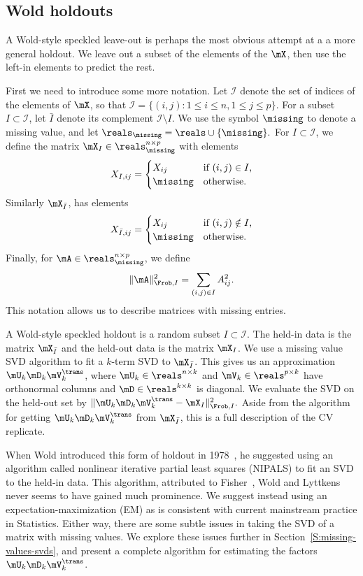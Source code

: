 \subsection{Wold holdouts}

A Wold-style speckled leave-out is perhaps the most obvious attempt at a a
more general holdout. We leave out a subset of the elements of the $\mX$, then
use the left-in elements to predict the rest.

First we need to introduce some more notation. Let $\mathcal{I}$ denote the
set of indices of the elements of $\mX$, so that $\mathcal{I} = \{ (i,j) : 1
\leq i \leq n, 1 \leq j \leq p \}$. For a subset $I \subset \mathcal{I}$, let
$\bar I$ denote its complement $\mathcal{I} \setminus I$. We use the symbol
$\missing$ to denote a missing value, and let 
\(
    \reals_\missing = \reals \cup \{ \missing \}.
\)
For $I \subset \mathcal{I}$, we define the matrix $\mX_I \in
\reals_\missing^{n \times p}$ with elements
\[
    X_{I,ij}
    =
    \begin{cases}
        X_{ij}     &\text{if $(i,j) \in I$,} \\
        \missing   &\text{otherwise.}
    \end{cases}
\]
Similarly $\mX_{\bar I}$, has elements
\[
    X_{\bar I,ij}
    =
    \begin{cases}
        X_{ij}     &\text{if $(i,j) \notin I$,} \\
        \missing   &\text{otherwise.}
    \end{cases}
\]
Finally, for $\mA \in \reals_\missing^{n \times p}$, we define
\[
    \| \mA \|_{\Frob,I}^2
        =
        \sum_{(i,j) \in I} A_{ij}^2.
\]
This notation allows us to describe matrices with missing entries.

A Wold-style speckled holdout is a random subset $I \subset \mathcal{I}$.  The 
held-in data is the matrix $\mX_{\bar I}$ and the held-out data is the matrix 
$\mX_I$.  We use a missing value SVD algorithm to fit a $k$-term SVD to 
$\mX_{\bar I}$.  This gives us an approximation $\mU_k \mD_k \mV_k^\trans$, 
where $\mU_k \in \reals^{n \times k}$ and $\mV_k \in \reals^{p \times k}$ have 
orthonormal columns and $\mD \in \reals^{k \times k}$ is diagonal.  We 
evaluate the SVD on the held-out set by 
\(
    \| \mU_k \mD_k \mV_k^\trans - \mX_I \|_{\Frob,I}^2.
\)
Aside from the algorithm for getting $\mU_k \mD_k \mV_k^\trans$ from 
$\mX_{\bar I}$, this is a full description of the CV replicate.

When Wold introduced this form of holdout in 1978~\cite{wold1978cross}, he
suggested using an algorithm called nonlinear iterative partial least squares
(NIPALS) to fit an SVD to the held-in data. This algorithm, attributed to
Fisher~\cite{fisher1923scv}, Wold and Lyttkens~\cite{wold1969nonlinear} never
seems to have gained much prominence. We suggest instead using an
expectation-maximization (EM) as is consistent with current mainstream
practice in Statistics. Either way, there are some subtle issues in taking the
SVD of a matrix with missing values. We explore these issues further in
Section~\ref{S:missing-values-svds}, and present a complete algorithm for
estimating the factors $\mU_k \mD_k \mV_k^\trans$.

